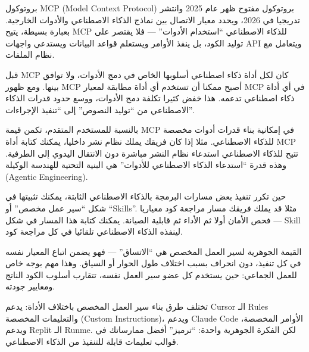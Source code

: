 


بروتوكول MCP (Model Context Protocol) بروتوكول مفتوح ظهر عام 2025 وانتشر تدريجيا في 2026، ويحدد معيار الاتصال بين نماذج الذكاء الاصطناعي والأدوات الخارجية. بعبارة بسيطة، يتيح MCP للذكاء الاصطناعي “استخدام الأدوات” — فلا يقتصر على توليد الكود، بل ينفذ الأوامر ويستعلم قواعد البيانات ويستدعي واجهات API ويتعامل مع نظام الملفات.

قبل MCP كان لكل أداة ذكاء اصطناعي أسلوبها الخاص في دمج الأدوات، ولا توافق بينها. ومع ظهور MCP أصبح ممكنا أن تستخدم أي أداة مطابقة لمعيار MCP في أي أداة ذكاء اصطناعي تدعمه. هذا خفض كثيرا تكلفة دمج الأدوات، ووسع حدود قدرات الذكاء الاصطناعي من “توليد النصوص” إلى “تنفيذ الإجراءات”.

بالنسبة للمستخدم المتقدم، تكمن قيمة MCP في إمكانية بناء قدرات أدوات مخصصة للذكاء الاصطناعي. مثلا إذا كان فريقك يملك نظام نشر داخليا، يمكنك كتابة أداة MCP تتيح للذكاء الاصطناعي استدعاء نظام النشر مباشرة دون الانتقال اليدوي إلى الطرفية. وهذه قدرة “استدعاء الذكاء الاصطناعي للأدوات” هي البنية التحتية للهندسة الوكيلة (Agentic Engineering).


حين تكرر تنفيذ بعض مسارات البرمجة بالذكاء الاصطناعي الثابتة، يمكنك تثبيتها في شكل “سير عمل مخصص” أو “Skills”. مثلا قد يملك فريقك مسار مراجعة كود معياريا — فحص الأمان أولا ثم الأداء ثم قابلية الصيانة. يمكنك كتابة هذا المسار في شكل Skill لينفذه الذكاء الاصطناعي تلقائيا في كل مراجعة كود.

القيمة الجوهرية لسير العمل المخصص هي “الاتساق” — فهو يضمن اتباع المعيار نفسه في كل تنفيذ، دون انحراف بسبب اختلاف طول الحوار أو السياق. وهذا مهم بوجه خاص للعمل الجماعي: حين يستخدم كل عضو سير العمل نفسه، تتقارب أسلوب الكود الناتج ومعايير جودته.

تختلف طرق بناء سير العمل المخصص باختلاف الأداة: يدعم Cursor الـ Rules والتعليمات المخصصة (Custom Instructions)، ويدعم Claude Code الأوامر المخصصة، ويدعم Replit الـ Runme. لكن الفكرة الجوهرية واحدة: “ترميز” أفضل ممارساتك في قوالب تعليمات قابلة للتنفيذ من الذكاء الاصطناعي.

